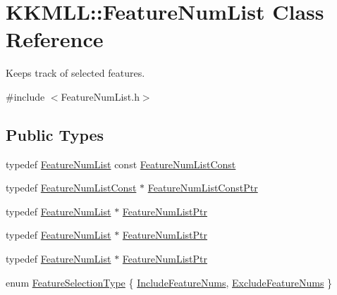 \hypertarget{class_k_k_m_l_l_1_1_feature_num_list}{}\section{K\+K\+M\+LL\+:\+:Feature\+Num\+List Class Reference}
\label{class_k_k_m_l_l_1_1_feature_num_list}


Keeps track of selected features.  




{\ttfamily \#include $<$Feature\+Num\+List.\+h$>$}

\subsection*{Public Types}
\begin{DoxyCompactItemize}
\item 
typedef \hyperlink{class_k_k_m_l_l_1_1_feature_num_list}{Feature\+Num\+List} const \hyperlink{class_k_k_m_l_l_1_1_feature_num_list_a2a39685c8a0cb219f57f9b256c92ed5c}{Feature\+Num\+List\+Const}
\item 
typedef \hyperlink{class_k_k_m_l_l_1_1_feature_num_list_a2a39685c8a0cb219f57f9b256c92ed5c}{Feature\+Num\+List\+Const} $\ast$ \hyperlink{class_k_k_m_l_l_1_1_feature_num_list_acd650e72db80d861917402aad0a2cd32}{Feature\+Num\+List\+Const\+Ptr}
\item 
typedef \hyperlink{class_k_k_m_l_l_1_1_feature_num_list}{Feature\+Num\+List} $\ast$ \hyperlink{class_k_k_m_l_l_1_1_feature_num_list_a8c7e53951a6f552a3f5e45c599ef05be}{Feature\+Num\+List\+Ptr}
\item 
typedef \hyperlink{class_k_k_m_l_l_1_1_feature_num_list}{Feature\+Num\+List} $\ast$ \hyperlink{class_k_k_m_l_l_1_1_feature_num_list_a8c7e53951a6f552a3f5e45c599ef05be}{Feature\+Num\+List\+Ptr}
\item 
typedef \hyperlink{class_k_k_m_l_l_1_1_feature_num_list}{Feature\+Num\+List} $\ast$ \hyperlink{class_k_k_m_l_l_1_1_feature_num_list_a8c7e53951a6f552a3f5e45c599ef05be}{Feature\+Num\+List\+Ptr}
\item 
enum \hyperlink{class_k_k_m_l_l_1_1_feature_num_list_a777e270c6cdfd3fb78618db362c718c3}{Feature\+Selection\+Type} \{ \hyperlink{class_k_k_m_l_l_1_1_feature_num_list_a777e270c6cdfd3fb78618db362c718c3a2936633ed613de669864c481c9539ed4}{Include\+Feature\+Nums}, 
\hyperlink{class_k_k_m_l_l_1_1_feature_num_list_a777e270c6cdfd3fb78618db362c718c3a4c4f8676af8878d1d26a2f1435e556bf}{Exclude\+Feature\+Nums}
 \}
\end{DoxyCompactItemize}
